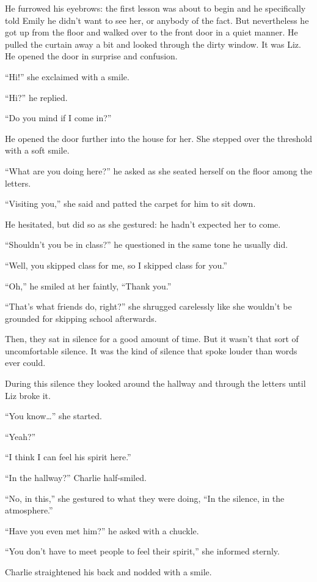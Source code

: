He furrowed his eyebrows: the first lesson was about to begin and he specifically told Emily he didn't want to see her, or anybody of the fact. But nevertheless he got up from the floor and walked over to the front door in a quiet manner. He pulled the curtain away a bit and looked through the dirty window. It was Liz. He opened the door in surprise and confusion.

“Hi!” she exclaimed with a smile.

“Hi?” he replied.

“Do you mind if I come in?”

He opened the door further into the house for her. She stepped over the threshold with a soft smile.

“What are you doing here?” he asked as she seated herself on the floor among the letters.

“Visiting you,” she said and patted the carpet for him to sit down.

He hesitated, but did so as she gestured: he hadn't expected her to come.

“Shouldn't you be in class?” he questioned in the same tone he usually did.

“Well, you skipped class for me, so I skipped class for you.”

“Oh,” he smiled at her faintly, “Thank you.”

“That's what friends do, right?” she shrugged carelessly like she wouldn't be grounded for skipping school afterwards.

Then, they sat in silence for a good amount of time. But it wasn't that sort of uncomfortable silence. It was the kind of silence that spoke louder than words ever could.

During this silence they looked around the hallway and through the letters until Liz broke it.

“You know…” she started.

“Yeah?”

“I think I can feel his spirit here.”

“In the hallway?” Charlie half-smiled.

“No, in this,” she gestured to what they were doing, “In the silence, in the atmosphere.”

“Have you even met him?” he asked with a chuckle.

“You don't have to meet people to feel their spirit,” she informed sternly.

Charlie straightened his back and nodded with a smile.

